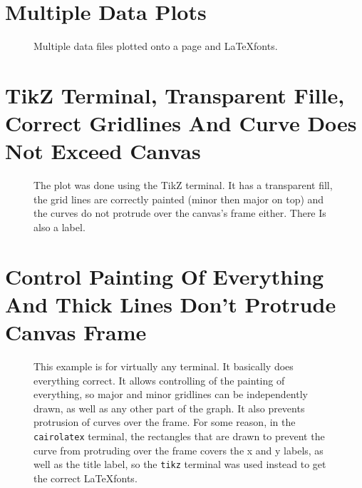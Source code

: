 \documentclass[10pt,a4paper,final]{report}
\begin{document}
\section{Multiple Data Plots}
\begin{figure}[!htbp]
\begin{center}
\resizebox{\columnwidth}{!}{}
\caption{Multiple data files plotted onto a page and \LaTeX fonts.}
\label{fig:Motor}
\end{center}
\end{figure}



\section{TikZ Terminal, Transparent Fille, Correct Gridlines And Curve Does Not Exceed Canvas}
\begin{figure}[htbp]
\begin{center}
\resizebox{\columnwidth}{!}{}
\caption{The plot was done using the TikZ terminal.  It has a transparent fill, the grid lines are correctly painted (minor then major on top) and the curves do not protrude over the canvas's frame either.  There Is also a label.}
\label{fig:AnimationMosfetClassAB}
\end{center}
\end{figure}


\section{Control Painting Of Everything And Thick Lines Don't Protrude Canvas Frame}
\begin{figure}[htbp]
\begin{center}
\resizebox{\columnwidth}{!}{}
\caption{This example is for virtually any terminal.  It basically does everything correct.  It allows controlling of the painting of everything, so major and minor gridlines can be independently drawn, as well as any other part of the graph.  It also prevents protrusion of curves over the frame.  For some reason, in the \texttt{cairolatex} terminal, the rectangles that are drawn to prevent the curve from protruding over the frame covers the x and y labels, as well as the title label, so the \texttt{tikz} terminal was used instead to get the correct \LaTeX fonts.}
\label{fig:MosfetClassAbPowerFixed}
\end{center}
\end{figure}

\end{document}
